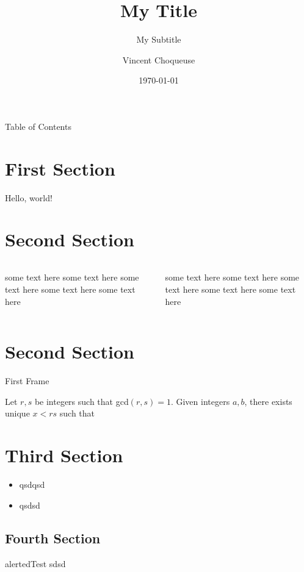 \documentclass{beamer}
\title{My Title}
\subtitle{My Subtitle}
\date{\today}
\author{Vincent Choqueuse}
\institute{ENIB}
\begin{document}
	\maketitle
  	\begin{frame}{Table of Contents}
  	\tableofcontents
  	\end{frame}
  
   	\section{First Section}
  	\begin{frame}{\insertsection}
    	Hello, world!
  	\end{frame}
  
  	\section{Second Section}
  	\begin{frame}{\insertsection}
  		\begin{columns}
			\begin{column}{0.5\textwidth}
  			some text here some text here some text here some text here some text here
			\end{column}
			\begin{column}{0.5\textwidth}  
   		 	some text here some text \alert{here} some text here some text here some text here
			\end{column}
		\end{columns}
  	\end{frame}
  
   	\section{Second Section}
  	\begin{frame}{First Frame}
 	\begin{theorem}[name]
        	Let $r, s$ be integers such that gcd$(r, s)=1$. 
        Given integers $a,b$, there exists unique 
        $x <rs$ such that 
        \end{theorem} 
  	\end{frame}
  
     	\section{Third Section}
  	\begin{frame}{\insertsection}
 	\begin{itemize}
	\item qsdqsd
	\item qsdsd
	\end{itemize}
  	\end{frame}
	
	 \subsection{Fourth Section}
  	\begin{frame}{\insertsection}
 	\begin{block}{alerted}{Test}
sdsd
	\end{block}
  	\end{frame}
  
  
\end{document}
